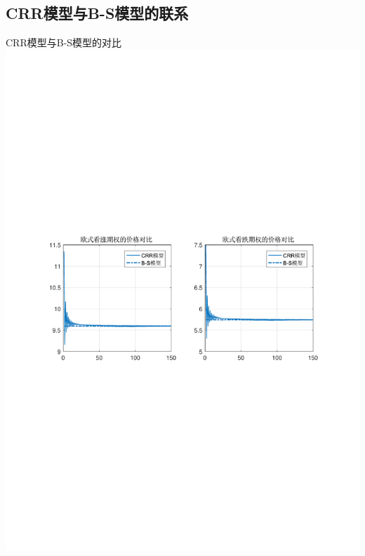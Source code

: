 \documentclass[t]{beamer}
\begin{document}
\subsection{CRR模型与B-S模型的联系}
\begin{frame}{CRR模型与B-S模型的对比}
	\centering
	\includegraphics[scale=.7]{fig/Bino-BS.PDF}
\end{frame}
\end{document}
